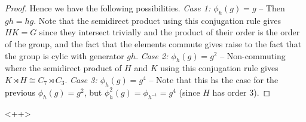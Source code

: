 \begin{proof}
  Hence we have the following possibilities. 
  \emph{Case 1: $\phi_h(g)=g$} -- Then $gh=hg$. Note that the semidirect product using
  this conjugation rule gives $HK=G$ since they intersect trivially and the product of
  their order is the order of the group, and the fact that the elements commute gives
  raise to the fact that the group is cylic with generator $gh$.
  \emph{Case 2: $\phi_h(g)=g^2$} -- Non-commuting where the semidirect product of $H$ and
  $K$ using this conjugation rule gives $K\rtimes H\cong C_7\rtimes C_3$.
  \emph{Case 3: $\phi_h(g)=g^4$} -- Note that this hs the case for the previous
  $\phi_h(g)=g^2$, but $\phi_h^2(g)=\phi_{h^{-1}}=g^4$ (since $H$ has order 3).
\end{proof}<++>
